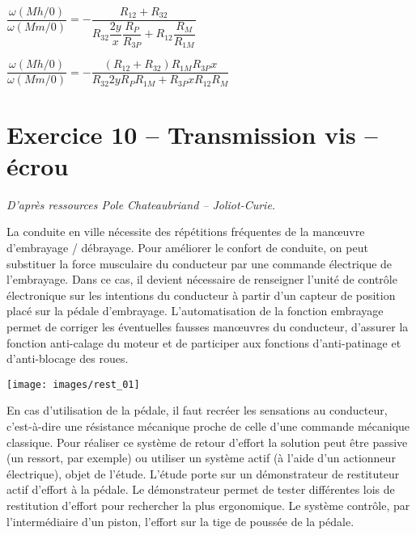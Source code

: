 \documentclass[10pt,fleqn]{article} %
\begin{document}
\begin{multicols}{2}
\begin{corrige}
$\dfrac{\omega(Mh/0)}{\omega(Mm/0)}=-\dfrac{R_{12}+R_{32}}{R_{32} \dfrac{2y}{x} \dfrac{R_P}{R_{3P}}  +R_{12} \dfrac{R_M}{R_{1M}}}$

$\dfrac{\omega(Mh/0)}{\omega(Mm/0)}=-\dfrac{\left( R_{12}+R_{32}\right)R_{1M} R_{3P}x }{R_{32} 2y R_PR_{1M} + R_{3P}xR_{12} R_M}$
\end{corrige}
\else
\fi
%
%

\section*{Exercice 10 -- Transmission vis -- écrou}
\textit{D'après ressources Pole Chateaubriand -- Joliot-Curie.}
\setcounter{exo}{0}

La conduite en ville nécessite des répétitions
fréquentes de la manœuvre d’embrayage /
débrayage. Pour améliorer le confort de conduite,
on peut substituer la force musculaire du
conducteur par une commande électrique de
l’embrayage. Dans ce cas, il devient nécessaire de
renseigner l’unité de contrôle électronique sur les
intentions du conducteur à partir d’un capteur de
position placé sur la pédale d’embrayage.
L’automatisation de la fonction embrayage
permet de corriger les éventuelles fausses
manœuvres du conducteur, d’assurer la fonction
anti-calage du moteur et de participer aux
fonctions d’anti-patinage et d’anti-blocage des
roues.

\begin{center}
\texttt{[image: images/rest\_01]}
\end{center}


En cas d’utilisation de la pédale, il faut recréer les sensations
au conducteur, c'est-à-dire une résistance mécanique proche
de celle d’une commande mécanique classique. Pour réaliser
ce système de retour d’effort la solution peut être passive (un
ressort, par exemple) ou utiliser un système actif (à l’aide d’un
actionneur électrique), objet de l’étude.
L’étude porte sur un démonstrateur de restituteur actif
d’effort à la pédale. Le démonstrateur permet de tester
différentes lois de restitution d’effort pour rechercher la plus
ergonomique. Le système contrôle, par l’intermédiaire d’un
piston, l’effort sur la tige de poussée de la pédale.



\end{multicols}
\end{document}
